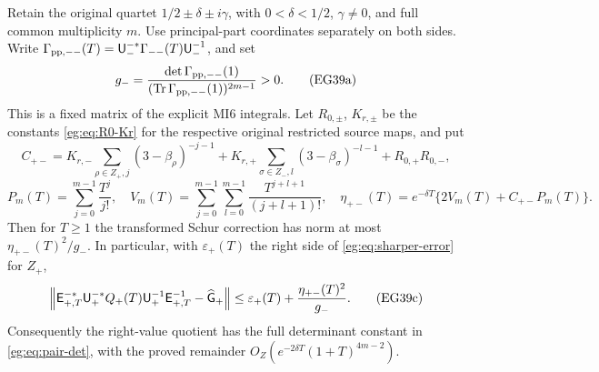 \documentclass[11pt]{article}
\begin{document}
\begin{egproposition}
\label{eg:prop:quartet-bound}
Retain the original quartet $1/2\pm\delta\pm i\gamma$, with
$0<\delta<1/2$, $\gamma\ne0$, and full common multiplicity $m$.
Use principal-part coordinates separately on both sides. Write
$\Gamma_{\rm pp,--}(T)=\mathsf U_-^{-*}\Gamma_{--}(T)\mathsf U_-^{-1}$, and set
\[
 g_- =\frac{\det\Gamma_{\rm pp,--}(1)}
              {(\operatorname{Tr}\Gamma_{\rm pp,--}(1))^{2m-1}}>0.
 \tag{EG39a}\label{eg:eq:left-fixed-bound}
\]
This is a fixed matrix of the explicit MI6 integrals. Let $R_{0,\pm}$,
$K_{r,\pm}$ be the constants \eqref{eg:eq:R0-Kr} for the respective
original restricted source maps, and put
\[
 C_{+-}=K_{r,-}\sum_{\rho\in Z_+,j}(3-\beta_\rho)^{-j-1}
       +K_{r,+}\sum_{\sigma\in Z_-,l}(3-\beta_\sigma)^{-l-1}
       +R_{0,+}R_{0,-},
\]
\[
 P_m(T)=\sum_{j=0}^{m-1}\frac{T^j}{j!},\quad
 V_m(T)=\sum_{j=0}^{m-1}\sum_{l=0}^{m-1}
                          \frac{T^{j+l+1}}{(j+l+1)!},\quad
 \eta_{+-}(T)=e^{-\delta T}\{2V_m(T)+C_{+-}P_m(T)\}.
 \tag{EG39b}\label{eg:eq:cross-finite-bound}
\]
Then for $T\ge1$ the transformed Schur correction has norm at most
$\eta_{+-}(T)^2/g_-$. In particular, with $\varepsilon_+(T)$ the
right side of \eqref{eg:eq:sharper-error} for $Z_+$,
\[
 \left\|\mathsf E_{+,T}^{-*}\mathsf U_+^{-*}Q_+(T)\mathsf U_+^{-1}\mathsf E_{+,T}^{-1}
                    -\widehat{\mathsf G}_+\right\|
 \le\varepsilon_+(T)+\frac{\eta_{+-}(T)^2}{g_-}.
 \tag{EG39c}\label{eg:eq:quotient-finite-bound}
\]
Consequently the right-value quotient has the full determinant
constant in \eqref{eg:eq:pair-det}, with the proved remainder
$O_Z(e^{-2\delta T}(1+T)^{4m-2})$.
\end{egproposition}
\end{document}
